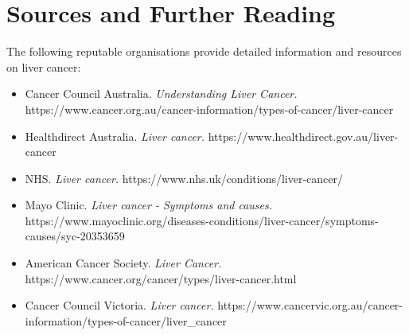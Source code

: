 \section*{Sources and Further Reading}
The following reputable organisations provide detailed information and resources on liver cancer:
\begin{itemize}
    \item Cancer Council Australia. \textit{Understanding Liver Cancer.} https://www.cancer.org.au/cancer-information/types-of-cancer/liver-cancer
    \item Healthdirect Australia. \textit{Liver cancer.} https://www.healthdirect.gov.au/liver-cancer
    \item NHS. \textit{Liver cancer.} https://www.nhs.uk/conditions/liver-cancer/
    \item Mayo Clinic. \textit{Liver cancer - Symptoms and causes.} https://www.mayoclinic.org/diseases-conditions/liver-cancer/symptoms-causes/syc-20353659
    \item American Cancer Society. \textit{Liver Cancer.} https://www.cancer.org/cancer/types/liver-cancer.html
    \item Cancer Council Victoria. \textit{Liver cancer.} https://www.cancervic.org.au/cancer-information/types-of-cancer/liver\_cancer
\end{itemize}

